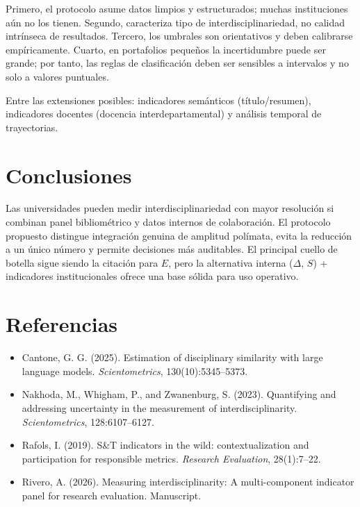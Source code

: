 \documentclass[
]{article}
\providecommand{\tightlist}{%
  \setlength{\itemsep}{0pt}\setlength{\parskip}{0pt}}
\begin{document}
Primero, el protocolo asume datos limpios y estructurados; muchas
instituciones aún no los tienen. Segundo, caracteriza tipo de
interdisciplinariedad, no calidad intrínseca de resultados. Tercero, los
umbrales son orientativos y deben calibrarse empíricamente. Cuarto, en
portafolios pequeños la incertidumbre puede ser grande; por tanto, las
reglas de clasificación deben ser sensibles a intervalos y no solo a
valores puntuales.

Entre las extensiones posibles: indicadores semánticos (título/resumen),
indicadores docentes (docencia interdepartamental) y análisis temporal
de trayectorias.

\hypertarget{conclusiones}{%
\section{Conclusiones}\label{conclusiones}}

Las universidades pueden medir interdisciplinariedad con mayor
resolución si combinan panel bibliométrico y datos internos de
colaboración. El protocolo propuesto distingue integración genuina de
amplitud polímata, evita la reducción a un único número y permite
decisiones más auditables. El principal cuello de botella sigue siendo
la citación para \(E\), pero la alternativa interna (\(\Delta\), \(S\))
+ indicadores institucionales ofrece una base sólida para uso operativo.

\hypertarget{referencias}{%
\section{Referencias}\label{referencias}}

\begin{itemize}
\tightlist
\item
  Cantone, G. G. (2025). Estimation of disciplinary similarity with
  large language models. \emph{Scientometrics}, 130(10):5345--5373.
\item
  Nakhoda, M., Whigham, P., and Zwanenburg, S. (2023). Quantifying and
  addressing uncertainty in the measurement of interdisciplinarity.
  \emph{Scientometrics}, 128:6107--6127.
\item
  Rafols, I. (2019). S\&T indicators in the wild: contextualization and
  participation for responsible metrics. \emph{Research Evaluation},
  28(1):7--22.
\item
  Rivero, A. (2026). Measuring interdisciplinarity: A multi-component
  indicator panel for research evaluation. Manuscript.
\end{itemize}
\end{document}
